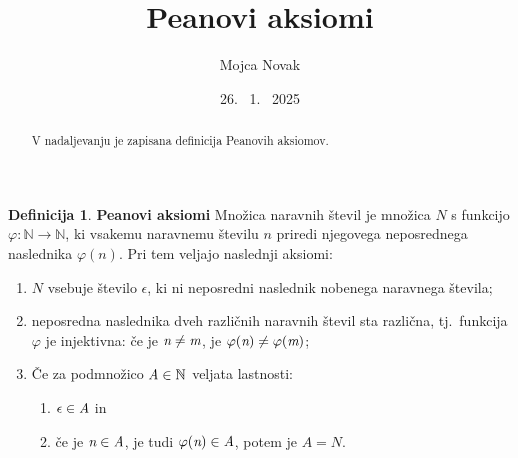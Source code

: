 \documentclass[a4paper, 11pt]{article}
\title{Peanovi aksiomi}
\author{Mojca Novak}
\date{26. \ 1. \ 2025}
\theoremstyle{definition}
\newtheorem{definicija}{Definicija}
\newcommand{\N}{\mathbb{N}}
\begin{document}
\maketitle
\begin{abstract}
            V nadaljevanju je zapisana definicija Peanovih aksiomov.

\end{abstract}

        \begin{definicija}
        
            \textbf{Peanovi aksiomi} \cite{zapiski} Množica naravnih števil je množica $N$ s funkcijo $\varphi : \N \to \N$, 
        ki vsakemu naravnemu številu $n$ priredi njegovega neposrednega naslednika $\varphi(n)$. 
        Pri tem veljajo naslednji aksiomi:
        \begin{enumerate}
            \item $N$ vsebuje število $\epsilon$, ki ni neposredni naslednik nobenega naravnega števila;
            \item neposredna naslednika dveh različnih naravnih števil sta različna, tj.\ funkcija $\varphi$ je injektivna: 
            če je $\emph{n} \neq \emph{m}$, je $\varphi(\emph{n}) \neq \varphi(\emph{m})$;
            \item Če za podmnožico $\emph{A} \in \N$ veljata lastnosti:
            \begin{enumerate}
                \item $\epsilon \in \emph{A}$ in
                \item če je $\emph{n} \in \emph{A}$, je tudi $\varphi(\emph{n}) \in \emph{A}$,
                potem je $A = N$.
            \end{enumerate}
        \end{enumerate}
        \end{definicija}
        
        

        
        
    
\end{document}

